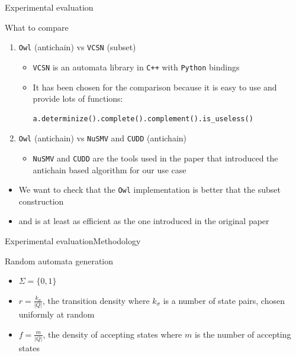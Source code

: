 \documentclass[10pt]{beamer}
\begin{document}
\begin{frame}[fragile]{Experimental evaluation}

\begin{block}{What to compare}
  \begin{enumerate}
    \item \texttt{Owl} (antichain) vs \texttt{VCSN} (subset)
    \begin{itemize}
      \item \texttt{VCSN} is an automata library in \texttt{C++} with \texttt{Python} bindings
      \item It has been chosen for the comparison because it is easy to use and provide lots of
      functions:
      \begin{lstlisting}
a.determinize().complete().complement().is_useless()
      \end{lstlisting}
    \end{itemize}
    \item \texttt{Owl} (antichain) vs \texttt{NuSMV} and \texttt{CUDD} (antichain)
    \begin{itemize}
      \item \texttt{NuSMV} and \texttt{CUDD} are the tools used in the paper  \cite{antichain-universality} that introduced the antichain based algorithm for our use case
    \end{itemize}
  \end{enumerate}
  \begin{itemize}
    \item We want to check that the \texttt{Owl} implementation is better that the subset construction
    \item and is at least as efficient as the one introduced in the original paper
  \end{itemize}
\end{block}
\end{frame}

\begin{frame}{Experimental evaluation}{Methodology}
  \begin{block}{Random automata generation}
  \begin{itemize}
    \item $\Sigma = \{0, 1\}$
    \item $r = \frac{k_\sigma}{|Q|}$, the transition density where $k_\sigma$ is a number of state pairs, chosen uniformly at random
    \item $f = \frac{m}{|Q|}$, the density of accepting states where $m$ is the number of accepting states
  \end{itemize}
\end{block}
\end{frame}
\end{document}
